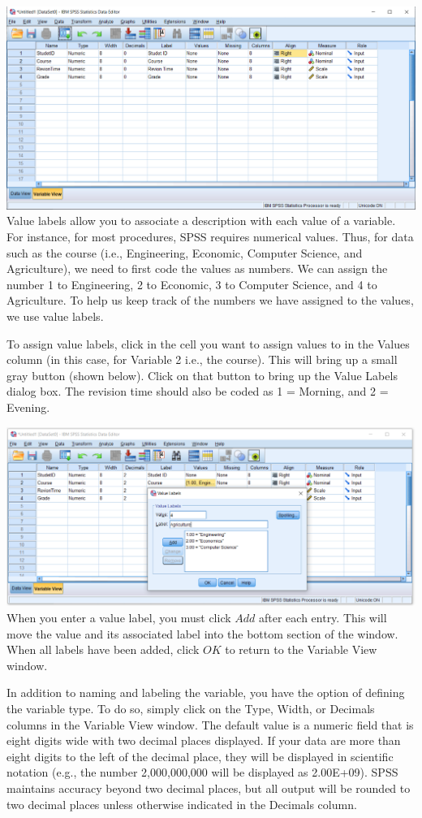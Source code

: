\documentclass[
]{book}
\begin{document}
\includegraphics{variableview.png}
Value labels allow you to associate a description with each value of a variable. For instance, for most procedures, SPSS requires numerical values. Thus, for data such as the course (i.e., Engineering, Economic, Computer Science, and Agriculture), we need to first code the values as numbers. We can assign the number 1 to Engineering, 2 to Economic, 3 to Computer Science, and 4 to Agriculture. To help us keep track of the numbers we have assigned to the values, we use value labels.

To assign value labels, click in the cell you want to assign values to in the Values column (in this case, for Variable 2 i.e., the course). This will bring up a small gray button (shown below). Click on that button to bring up the Value Labels dialog box. The revision time should also be coded as 1 = Morning, and 2 = Evening.

\includegraphics{valuelabel.png}
When you enter a value label, you must click \(\textit{Add}\) after each entry. This will move the value and its associated label into the bottom section of the window. When all labels have been added, click \(\textit{OK}\) to return to the Variable View window.

In addition to naming and labeling the variable, you have the option of defining the variable type. To do so, simply click on the Type, Width, or Decimals columns in the Variable View window. The default value is a numeric field that is eight digits wide with two decimal places displayed. If your data are more than eight digits to the left of the decimal place, they will be displayed in scientific notation (e.g., the number 2,000,000,000 will be displayed as 2.00E+09). SPSS maintains accuracy beyond two decimal places, but all output will be rounded to two decimal places unless otherwise indicated in the Decimals column.
\end{document}
